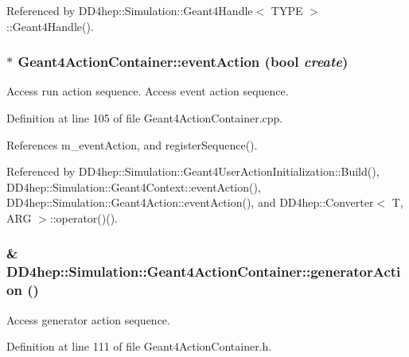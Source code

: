 Referenced by DD4hep::Simulation::Geant4Handle$<$ TYPE $>$::Geant4Handle().\hypertarget{class_d_d4hep_1_1_simulation_1_1_geant4_action_container_ab195f38387e12afbfcaccee77ec67845}{
\subsubsection[{eventAction}]{ $\ast$ Geant4ActionContainer::eventAction (bool {\em create})}}
\label{class_d_d4hep_1_1_simulation_1_1_geant4_action_container_ab195f38387e12afbfcaccee77ec67845}


Access run action sequence. Access event action sequence. 

Definition at line 105 of file Geant4ActionContainer.cpp.

References m\_\-eventAction, and registerSequence().

Referenced by DD4hep::Simulation::Geant4UserActionInitialization::Build(), DD4hep::Simulation::Geant4Context::eventAction(), DD4hep::Simulation::Geant4Action::eventAction(), and DD4hep::Converter$<$ T, ARG $>$::operator()().\hypertarget{class_d_d4hep_1_1_simulation_1_1_geant4_action_container_a1c16fc087f37dc5350691bcc89a7a40e}{
\subsubsection[{generatorAction}]{\& DD4hep::Simulation::Geant4ActionContainer::generatorAction ()}}
\label{class_d_d4hep_1_1_simulation_1_1_geant4_action_container_a1c16fc087f37dc5350691bcc89a7a40e}


Access generator action sequence. 

Definition at line 111 of file Geant4ActionContainer.h.

